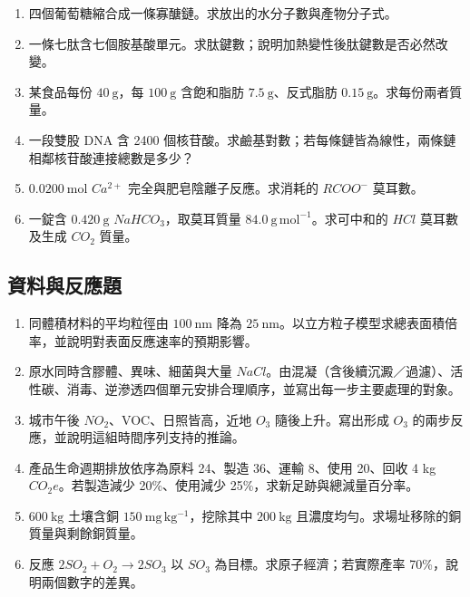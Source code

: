 \documentclass[11pt,a4paper]{article}
\providecommand{\tightlist}{%
  \setlength{\itemsep}{0pt}\setlength{\parskip}{0pt}}
\begin{document}
\begin{enumerate}
\def\labelenumi{\arabic{enumi}.}
\tightlist
\item
  四個葡萄糖縮合成一條寡醣鏈。求放出的水分子數與產物分子式。
\item
  一條七肽含七個胺基酸單元。求肽鍵數；說明加熱變性後肽鍵數是否必然改變。
\item
  某食品每份 \(40\ \mathrm g\)，每 \(100\ \mathrm g\) 含飽和脂肪 \(7.5\ \mathrm g\)、反式脂肪 \(0.15\ \mathrm g\)。求每份兩者質量。
\item
  一段雙股 DNA 含 2400 個核苷酸。求鹼基對數；若每條鏈皆為線性，兩條鏈相鄰核苷酸連接總數是多少？
\item
  \(0.0200\ \mathrm{mol}\) \(Ca^{2+}\) 完全與肥皂陰離子反應。求消耗的 \(RCOO^-\) 莫耳數。
\item
  一錠含 \(0.420\ \mathrm g\) \(NaHCO_3\)，取莫耳質量 \(84.0\ \mathrm{g\,mol^{-1}}\)。求可中和的 \(HCl\) 莫耳數及生成 \(CO_2\) 質量。
\end{enumerate}

\subsection{資料與反應題}\label{ux8cc7ux6599ux8207ux53cdux61c9ux984c}

\begin{enumerate}
\def\labelenumi{\arabic{enumi}.}
\setcounter{enumi}{6}
\tightlist
\item
  同體積材料的平均粒徑由 \(100\ \mathrm{nm}\) 降為 \(25\ \mathrm{nm}\)。以立方粒子模型求總表面積倍率，並說明對表面反應速率的預期影響。
\item
  原水同時含膠體、異味、細菌與大量 \(NaCl\)。由混凝（含後續沉澱／過濾）、活性碳、消毒、逆滲透四個單元安排合理順序，並寫出每一步主要處理的對象。
\item
  城市午後 \(NO_2\)、VOC、日照皆高，近地 \(O_3\) 隨後上升。寫出形成 \(O_3\) 的兩步反應，並說明這組時間序列支持的推論。
\item
  產品生命週期排放依序為原料 24、製造 36、運輸 8、使用 20、回收 4 kg \(CO_2e\)。若製造減少 20\%、使用減少 25\%，求新足跡與總減量百分率。
\item
  \(600\ \mathrm{kg}\) 土壤含銅 \(150\ \mathrm{mg\,kg^{-1}}\)，挖除其中 \(200\ \mathrm{kg}\) 且濃度均勻。求場址移除的銅質量與剩餘銅質量。
\item
  反應 \(2SO_2+O_2\rightarrow2SO_3\) 以 \(SO_3\) 為目標。求原子經濟；若實際產率 70\%，說明兩個數字的差異。
\end{enumerate}
\end{document}
